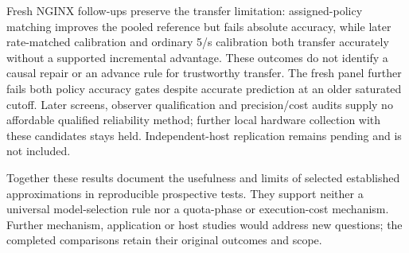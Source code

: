 \documentclass[11pt,a4paper]{article}
\begin{document}
Fresh NGINX follow-ups preserve the transfer limitation: assigned-policy matching
improves the pooled reference but fails absolute accuracy, while later rate-matched
calibration and ordinary 5/s calibration both transfer accurately without a
supported incremental advantage. These outcomes do not identify a causal repair
or an advance rule for trustworthy transfer. The fresh panel further fails
both policy accuracy gates despite accurate prediction at an older saturated
cutoff. Later screens, observer qualification and precision/cost audits supply
no affordable qualified reliability method; further local hardware collection
with these candidates stays held. Independent-host replication remains
pending and is not included.

Together these results document the usefulness and limits of selected
established approximations in reproducible prospective tests. They support
neither a universal model-selection rule nor a quota-phase or execution-cost
mechanism. Further mechanism, application or host studies would address new
questions; the completed comparisons retain their original outcomes and scope.
\end{document}
